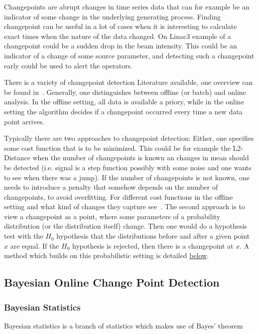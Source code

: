 \documentclass[12pt,a4paper]{article}
\begin{document}
Changepoints are abrupt changes in time series data that can for example be an indicator of some change in the underlying generating process. Finding changepoint can be useful in a lot of cases when it is interesting to calculate exact times when the nature of the data changed. On Linac3 example of a changepoint could be a sudden drop in the beam intensity. This could be an indicator of a change of some source parameter, and detecting such a changepoint early could be used to alert the operators.

There is a variety of changepoint detection Literature available, one overview can be found in~\cite{Aminikhanghahi:surveymethodstime}. Generally, one distinguishes between offline (or batch) and online analysis. In the offline setting, all data is available a priory, while in the online setting the algorithm decides if a changepoint occurred every time a new data point arrives. 

Typically there are two approaches to changepoint detection: Either, one specifies some cost function that is to be minimized. This could be for example the L2-Distance when the number of changepoints is known an changes in mean should be detected (i.e. signal is a step function possibly with some noise and one wants to see when there was a jump). If the number of changepoints is not known, one needs to introduce a penalty that somehow depends on the number of changepoints, to avoid overfitting. For different cost functions in the offline setting and what kind of changes they capture see~\cite{Truong:Selectivereviewoffline}. The second approach is to view a changepoint as a point, where some parameters of a probability distribution (or the distribution itself) change. Then one would do a hypothesis test with the $H_0$ hypothesis that the distributions before and after a given point $x$ are equal. If the $H_0$ hypothesis is rejected, then there is a changepoint at $x$. A method which builds on this probabilistic setting is detailed \protect\hyperlink{bayesian-online-changepoint-detection}{below}.

\hypertarget{bayesian-online-changepoint-detection}{
\subsection{Bayesian Online Change Point Detection}\label{bayesian-online-changepoint-detection}}

\subsubsection{Bayesian Statistics}
Bayesian statistics is a branch of statistics which makes use of Bayes' theorem
\end{document}
